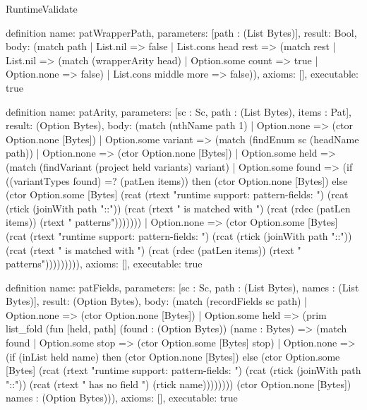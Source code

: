 \begin{lexlean}{RuntimeValidate}
\begin{semanticmodule}
definition{
  name: patWrapperPath,
  parameters: [path : (List Bytes)],
  result: Bool,
  body: (match path
    | List.nil => false
    | List.cons head rest => (match rest
      | List.nil => (match (wrapperArity head) | Option.some count => true | Option.none => false)
      | List.cons middle more => false)),
  axioms: [],
  executable: true
}

definition{
  name: patArity,
  parameters: [sc : Sc, path : (List Bytes), items : Pat],
  result: (Option Bytes),
  body: (match (nthName path 1)
    | Option.none => (ctor Option.none [Bytes])
    | Option.some variant => (match (findEnum sc (headName path))
      | Option.none => (ctor Option.none [Bytes])
      | Option.some held => (match (findVariant (project held variants) variant)
        | Option.some found => (if ((variantTypes found) =? (patLen items)) then (ctor Option.none [Bytes]) else (ctor Option.some [Bytes] (rcat (rtext "runtime support: pattern-fields: ") (rcat (rtick (joinWith path "::")) (rcat (rtext " is matched with ") (rcat (rdec (patLen items)) (rtext " patterns")))))))
        | Option.none => (ctor Option.some [Bytes] (rcat (rtext "runtime support: pattern-fields: ") (rcat (rtick (joinWith path "::")) (rcat (rtext " is matched with ") (rcat (rdec (patLen items)) (rtext " patterns"))))))))),
  axioms: [],
  executable: true
}

definition{
  name: patFields,
  parameters: [sc : Sc, path : (List Bytes), names : (List Bytes)],
  result: (Option Bytes),
  body: (match (recordFields sc path)
    | Option.none => (ctor Option.none [Bytes])
    | Option.some held => (prim list_fold (fun [held, path] (found : (Option Bytes)) (name : Bytes) => (match found
      | Option.some stop => (ctor Option.some [Bytes] stop)
      | Option.none => (if (inList held name) then (ctor Option.none [Bytes]) else (ctor Option.some [Bytes] (rcat (rtext "runtime support: pattern-fields: ") (rcat (rtick (joinWith path "::")) (rcat (rtext " has no field ") (rtick name)))))))) (ctor Option.none [Bytes]) names : (Option Bytes))),
  axioms: [],
  executable: true
}


\end{semanticmodule}
\end{lexlean}
